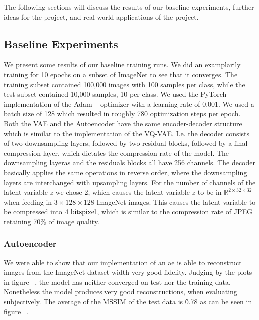 The following sections will discuss the results of our baseline experiments, further ideas for the project, and real-world applications of the project.

\subsection{Baseline Experiments}\label{subsec:baseline-results}
    We present some results of our baseline training runs.
    We did an examplarily training for 10 epochs on a subset of ImageNet to see that it converges.
    The training subset contained 100,000 images with 100 samples per class, while the test subset contained 10,000 samples, 10 per class.
    We used the PyTorch implementation of the Adam ~\cite{citationNeeded} optimizer with a learning rate of 0.001.
    We used a batch size of 128 which resulted in roughly 780 optimization steps per epoch.
    Both the VAE and the Autoencoder have the same encoder-decoder structure which is similar to the implementation of the VQ-VAE.
    I.e. the decoder consists of two downsampling layers, followed by two residual blocks, followed by a final compression layer, which dictates the compression rate of the model.
    The downsampling layeras and the residuals blocks all have 256 channels.
    The decoder basically applies the same operations in reverse order, where the downsampling layers are interchanged with upsampling layers.
    For the number of channels of the latent variable $z$ we chose 2, which causes the latent variable $z$ to be in $\mathbb{R}^{2\times 32 \times 32}$ when feeding in $3 \times 128 \times 128$ ImageNet images.
    This causes the latent variable to be compressed into $4\text{ bits}\/\text{pixel}$, which is similar to the compression rate of JPEG retaining 70\% of image quality.
    
    \subsubsection{Autoencoder}\label{subsubsec:autoencoder}
        We were able to show that our implementation of an \ac{ae} is able to reconstruct images from the ImageNet dataset width very good fidelity.
        Judging by the plots in figure ~\cite{citationNeeded}, the model has neither converged on test nor the training data.
        Nonetheless the model produces very good reconstructions, when evaluating subjectively.
        The average of the MSSIM of the test data is \~0.78 as can be seen in figure ~\cite{citationNeeded}.



